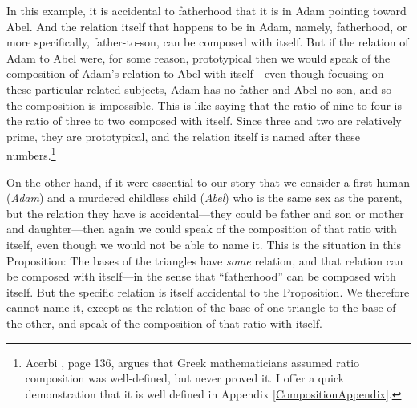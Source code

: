\documentclass[11pt]{article}
\newcommand{\flushleftright}{\noindent\justifying}
\begin{document}
\flushleftright
In this example, it is accidental to fatherhood that it is in Adam pointing toward Abel. And the relation itself that happens to be in Adam, namely, fatherhood, or more specifically, father-to-son, can be composed with itself. But if the relation of Adam to Abel were, for some reason, prototypical then we would speak of the composition of Adam's relation to Abel with itself---even though focusing on these particular related subjects, Adam has no father and Abel no son, and so the composition is impossible. This is like saying that the ratio of nine to four is the ratio of three to two composed with itself. Since three and two are relatively prime, they are prototypical, and the relation itself is named after these numbers.\footnote{\label{wellDefined}Acerbi \citep{acerbi2011}, page 136, argues that Greek mathematicians assumed ratio composition was well-defined, but never proved it. I offer a quick demonstration that it is well defined in Appendix \ref{CompositionAppendix}.%
}

On the other hand, if it were essential to our story that we consider a first human (\textit{Adam}) and a murdered childless child (\textit{Abel}) who is the same sex as the parent, but the relation they have is accidental---they could be father and son or mother and daughter---then again we could speak of the composition of that ratio with itself, even though we would not be able to name it. This is the situation in this Proposition: The bases of the triangles have \textit{some} relation, and that relation can be composed with itself---in the sense that ``fatherhood'' can be composed with itself. But the specific relation is itself accidental to the Proposition. We therefore cannot name it, except as the relation of the base of one triangle to the base of the other, and speak of the composition of that ratio with itself.
\end{document}

